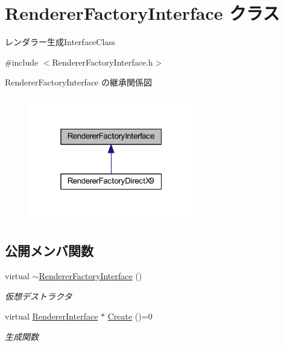 \hypertarget{class_renderer_factory_interface}{}\section{Renderer\+Factory\+Interface クラス}
\label{class_renderer_factory_interface}


レンダラー生成\+Interface\+Class  




{\ttfamily \#include $<$Renderer\+Factory\+Interface.\+h$>$}



Renderer\+Factory\+Interface の継承関係図
\nopagebreak
\begin{figure}[H]
\begin{center}
\leavevmode
\includegraphics[width=205pt]{class_renderer_factory_interface__inherit__graph}
\end{center}
\end{figure}
\subsection*{公開メンバ関数}
\begin{DoxyCompactItemize}
\item 
virtual \mbox{\hyperlink{class_renderer_factory_interface_a4a81c222850b5fbd1cced8a193f7b8ab}{$\sim$\+Renderer\+Factory\+Interface}} ()
\begin{DoxyCompactList}\small\item\em 仮想デストラクタ \end{DoxyCompactList}\item 
virtual \mbox{\hyperlink{class_renderer_interface}{Renderer\+Interface}} $\ast$ \mbox{\hyperlink{class_renderer_factory_interface_aa81911973b6079fda8489409385d71e3}{Create}} ()=0
\begin{DoxyCompactList}\small\item\em 生成関数 \end{DoxyCompactList}\end{DoxyCompactItemize}



